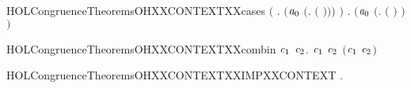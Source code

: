 \begin{SaveVerbatim}{HOLCongruenceTheoremsOHXXCONTEXTXXcases}
       \ensuremath{(}\HOLSymConst{\HOLTokenExists{}} . \ensuremath{(}\ensuremath{\HOLBoundVar{a}\sb{\mathrm{0}}} \HOLSymConst{\ensuremath{=}} \ensuremath{(}\HOLTokenLambda{}.   \ensuremath{(} \ensuremath{)}\ensuremath{)}\ensuremath{)} \HOLSymConst{\HOLTokenConj{}}  \ensuremath{)} \HOLSymConst{\HOLTokenDisj{}}
       \HOLSymConst{\HOLTokenExists{}} . \ensuremath{(}\ensuremath{\HOLBoundVar{a}\sb{\mathrm{0}}} \HOLSymConst{\ensuremath{=}} \ensuremath{(}\HOLTokenLambda{}.  \ensuremath{(} \ensuremath{)} \ensuremath{)}\ensuremath{)} \HOLSymConst{\HOLTokenConj{}}  
\end{SaveVerbatim}
\newcommand{\HOLCongruenceTheoremsOHXXCONTEXTXXcases}{\UseVerbatim{HOLCongruenceTheoremsOHXXCONTEXTXXcases}}
\begin{SaveVerbatim}{HOLCongruenceTheoremsOHXXCONTEXTXXcombin}
\HOLTokenTurnstile{} \HOLSymConst{\HOLTokenForall{}}\ensuremath{\HOLBoundVar{c}\sb{\mathrm{1}}} \ensuremath{\HOLBoundVar{c}\sb{\mathrm{2}}}.  \ensuremath{\HOLBoundVar{c}\sb{\mathrm{1}}} \HOLSymConst{\HOLTokenConj{}}  \ensuremath{\HOLBoundVar{c}\sb{\mathrm{2}}} \HOLSymConst{\HOLTokenImp{}}  \ensuremath{(}\ensuremath{\HOLBoundVar{c}\sb{\mathrm{1}}} \HOLConst{\HOLTokenCompose} \ensuremath{\HOLBoundVar{c}\sb{\mathrm{2}}}\ensuremath{)}
\end{SaveVerbatim}
\newcommand{\HOLCongruenceTheoremsOHXXCONTEXTXXcombin}{\UseVerbatim{HOLCongruenceTheoremsOHXXCONTEXTXXcombin}}
\begin{SaveVerbatim}{HOLCongruenceTheoremsOHXXCONTEXTXXIMPXXCONTEXT}
\HOLTokenTurnstile{} \HOLSymConst{\HOLTokenForall{}}.   \HOLSymConst{\HOLTokenImp{}}  
\end{SaveVerbatim}
\newcommand{\HOLCongruenceTheoremsOHXXCONTEXTXXIMPXXCONTEXT}{\UseVerbatim{HOLCongruenceTheoremsOHXXCONTEXTXXIMPXXCONTEXT}}

